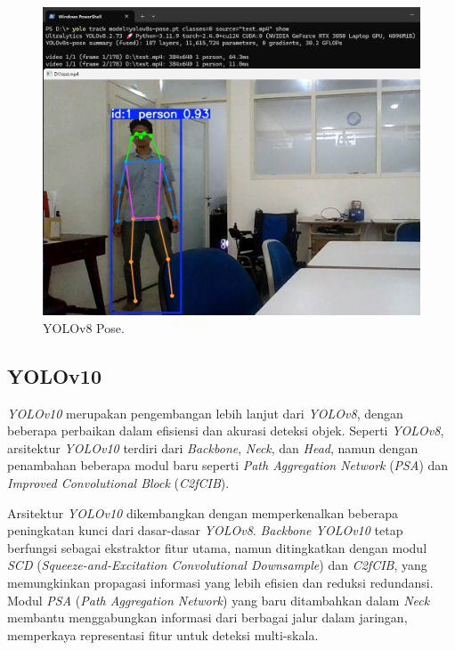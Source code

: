 \begin{figure}[H]
  \centering
  \includegraphics[scale=0.4]{gambar/yolov8Pose.png}
  \caption{YOLOv8 Pose.}
  \label{fig:Yolov8Pose}
\end{figure}

\subsection{YOLOv10}
\label{subsec:YOLOv10}

\emph{YOLOv10} merupakan pengembangan lebih lanjut dari \emph{YOLOv8}, dengan beberapa perbaikan dalam efisiensi dan akurasi deteksi objek. Seperti \emph{YOLOv8}, arsitektur \emph{YOLOv10} terdiri dari \emph{Backbone}, \emph{Neck}, dan \emph{Head}, namun dengan penambahan beberapa modul baru seperti \emph{Path Aggregation Network} (\emph{PSA}) dan \emph{Improved Convolutional Block} (\emph{C2fCIB}).

Arsitektur \emph{YOLOv10} dikembangkan dengan memperkenalkan beberapa peningkatan kunci dari dasar-dasar \emph{YOLOv8}. \emph{Backbone YOLOv10} tetap berfungsi sebagai ekstraktor fitur utama, namun ditingkatkan dengan modul \emph{SCD} (\emph{Squeeze-and-Excitation Convolutional Downsample}) dan \emph{C2fCIB}, yang memungkinkan propagasi informasi yang lebih efisien dan reduksi redundansi. Modul \emph{PSA} (\emph{Path Aggregation Network}) yang baru ditambahkan dalam \emph{Neck} membantu menggabungkan informasi dari berbagai jalur dalam jaringan, memperkaya representasi fitur untuk deteksi multi-skala.

